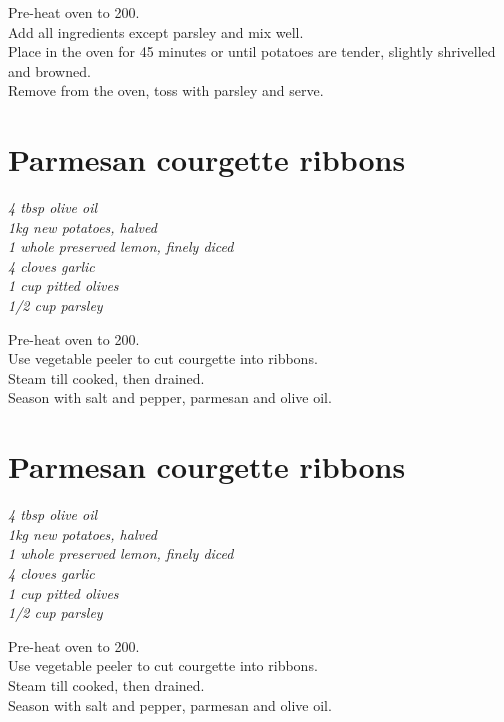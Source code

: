 \documentclass{tufte-book}
\begin{document}
Pre-heat oven to 200\celsius.
\\Add all ingredients except parsley and mix well.
\\Place in the oven for 45 minutes or until potatoes are tender, slightly shrivelled and browned. 
\\Remove from the oven, toss with parsley and serve.


\section{Parmesan courgette ribbons}

\emph{4 tbsp olive oil
\\1kg new potatoes, halved
\\1 whole preserved lemon, finely diced
\\4 cloves garlic
\\1 cup pitted olives
\\1/2 cup parsley
}

\smallskip
Pre-heat oven to 200\celsius.
\\Use vegetable peeler to cut courgette into ribbons.
\\Steam till cooked, then drained.
\\Season with salt and pepper, parmesan and olive oil.


\section{Parmesan courgette ribbons}

\emph{4 tbsp olive oil
\\1kg new potatoes, halved
\\1 whole preserved lemon, finely diced
\\4 cloves garlic
\\1 cup pitted olives
\\1/2 cup parsley
}

\smallskip
Pre-heat oven to 200\celsius.
\\Use vegetable peeler to cut courgette into ribbons.
\\Steam till cooked, then drained.
\\Season with salt and pepper, parmesan and olive oil.
\end{document}
